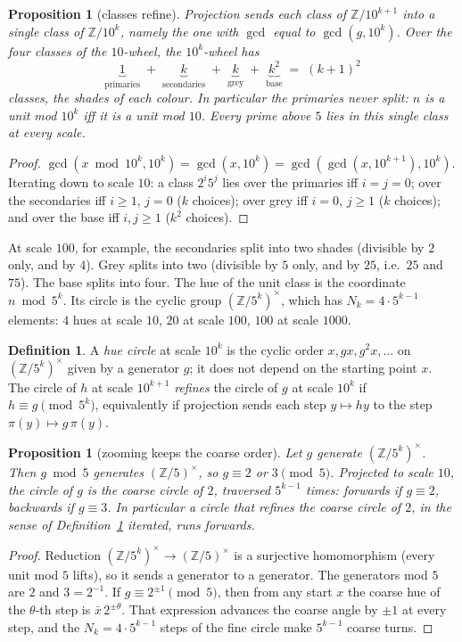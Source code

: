 \documentclass[11pt]{article}
\newcommand{\Z}{\mathbb Z}
\theoremstyle{plain}
\newtheorem{proposition}[theorem]{Proposition}
\theoremstyle{definition}
\newtheorem{definition}[theorem]{Definition}
\theoremstyle{remark}
\begin{document}
\begin{proposition}[classes refine]\label{prop:refine}
Projection sends each class of $\Z/10^{k+1}$ into a single class of $\Z/10^{k}$, namely the one with
$\gcd$ equal to $\gcd(g,10^k)$. Over the four classes of the $10$-wheel, the $10^k$-wheel has
\[
\underbrace{1}_{\text{primaries}}\;+\;\underbrace{k}_{\text{secondaries}}\;+\;
\underbrace{k}_{\text{grey}}\;+\;\underbrace{k^2}_{\text{base}}\;=\;(k+1)^2
\]
classes, the \emph{shades} of each colour. In particular the primaries never split: $n$ is a unit
mod $10^k$ iff it is a unit mod $10$. Every prime above $5$ lies in this single class at every scale.
\end{proposition}
\begin{proof}
$\gcd(x\bmod 10^k,10^k)=\gcd(x,10^k)=\gcd(\gcd(x,10^{k+1}),10^k)$. Iterating down to scale $10$:
a class $2^i5^j$ lies over the primaries iff $i=j=0$; over the secondaries iff $i\ge1$, $j=0$ ($k$
choices); over grey iff $i=0$, $j\ge1$ ($k$ choices); and over the base iff $i,j\ge1$ ($k^2$
choices).
\end{proof}

\noindent
At scale $100$, for example, the secondaries split into two shades (divisible by $2$ only, and by
$4$). Grey splits into two (divisible by $5$ only, and by $25$, i.e.\ $25$ and $75$). The base
splits into four. The hue of the unit class is the coordinate $n\bmod 5^k$. Its circle is the
cyclic group $(\Z/5^k)^\times$, which has $N_k=4\cdot5^{k-1}$ elements: $4$ hues at scale $10$, $20$
at scale $100$, $100$ at scale $1000$.

\begin{definition}\label{def:circle}
A \emph{hue circle} at scale $10^k$ is the cyclic order $x,gx,g^2x,\dots$ on $(\Z/5^k)^\times$
given by a generator $g$; it does not depend on the starting point $x$. The circle of $h$ at scale
$10^{k+1}$ \emph{refines} the circle of $g$ at scale $10^k$ if $h\equiv g\pmod{5^k}$, equivalently
if projection sends each step $y\mapsto hy$ to the step $\pi(y)\mapsto g\,\pi(y)$.
\end{definition}

\begin{proposition}[zooming keeps the coarse order]\label{prop:zoom}
Let $g$ generate $(\Z/5^{k})^\times$. Then $g\bmod5$ generates $(\Z/5)^\times$, so $g\equiv2$ or
$3\pmod 5$. Projected to scale $10$, the circle of $g$ is the coarse circle of $2$, traversed
$5^{k-1}$ times: forwards if $g\equiv2$, backwards if $g\equiv3$. In particular a circle that
refines the coarse circle of $2$, in the sense of Definition~\ref{def:circle} iterated, runs
forwards.
\end{proposition}
\begin{proof}
Reduction $(\Z/5^k)^\times\to(\Z/5)^\times$ is a surjective homomorphism (every unit mod $5$ lifts),
so it sends a generator to a generator. The generators mod $5$ are $2$ and $3=2^{-1}$. If
$g\equiv2^{\pm1}\pmod5$, then from any start $x$ the coarse hue of the $\theta$-th step is
$\bar x\,2^{\pm\theta}$. That expression advances the coarse angle by $\pm1$ at every step, and the
$N_k=4\cdot5^{k-1}$ steps of the fine circle make $5^{k-1}$ coarse turns.
\end{proof}
\end{document}
